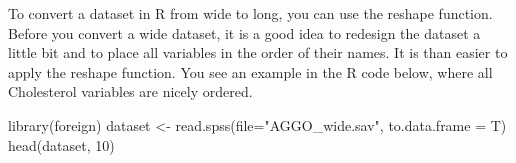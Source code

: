 \documentclass[
]{book}
\newenvironment{Shaded}{\begin{snugshade}}{\end{snugshade}}
\newcommand{\AttributeTok}[1]{\textcolor[rgb]{0.77,0.63,0.00}{#1}}
\newcommand{\DecValTok}[1]{\textcolor[rgb]{0.00,0.00,0.81}{#1}}
\newcommand{\FunctionTok}[1]{\textcolor[rgb]{0.00,0.00,0.00}{#1}}
\newcommand{\NormalTok}[1]{#1}
\newcommand{\OtherTok}[1]{\textcolor[rgb]{0.56,0.35,0.01}{#1}}
\newcommand{\StringTok}[1]{\textcolor[rgb]{0.31,0.60,0.02}{#1}}
\begin{document}
To convert a dataset in R from wide to long, you can use the reshape function. Before you convert a wide dataset, it is a good idea to redesign the dataset a little bit and to place all variables in the order of their names. It is than easier to apply the reshape function. You see an example in the R code below, where all Cholesterol variables are nicely ordered.

\begin{Shaded}
\begin{Highlighting}[]
\FunctionTok{library}\NormalTok{(foreign)}
\NormalTok{dataset }\OtherTok{\textless{}{-}} \FunctionTok{read.spss}\NormalTok{(}\AttributeTok{file=}\StringTok{"AGGO\_wide.sav"}\NormalTok{, }\AttributeTok{to.data.frame =}\NormalTok{ T)}
\FunctionTok{head}\NormalTok{(dataset, }\DecValTok{10}\NormalTok{)}
\end{Highlighting}
\end{Shaded}
\end{document}
